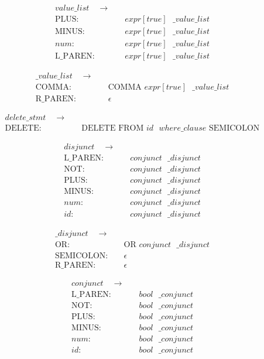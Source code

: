 \documentclass{article}
\begin{document}
\begin{align*}
value\_list \quad  \to & \quad\\
\text{PLUS}: & \quad expr[true] \text{ } \_value\_list \\
\text{MINUS}: & \quad expr[true] \text{ } \_value\_list \\
num: & \quad expr[true] \text{ } \_value\_list \\
\text{L\_PAREN}: & \quad expr[true] \text{ } \_value\_list
\end{align*}

\begin{align*}
\_value\_list \quad  \to & \quad\\
\text{COMMA}: & \quad \text{COMMA } expr[true] \text{ } \_value\_list \\
\text{R\_PAREN}: & \quad \epsilon
\end{align*}

\begin{align*}
delete\_stmt \quad  \to & \quad\\
\text{DELETE}: & \quad \text{DELETE FROM } id \text{ } where\_clause \text{ SEMICOLON}
\end{align*}


\begin{align*}
disjunct \quad  \to & \quad\\
\text{L\_PAREN}: & \quad conjunct \text{ } \_disjunct \\
\text{NOT}: & \quad conjunct \text{ } \_disjunct \\
\text{PLUS}: & \quad conjunct \text{ } \_disjunct \\
\text{MINUS}: & \quad conjunct \text{ } \_disjunct \\
num: & \quad conjunct \text{ } \_disjunct \\
id: & \quad conjunct \text{ } \_disjunct
\end{align*}

\begin{align*}
\_disjunct \quad  \to & \quad\\
\text{OR}: & \quad \text{OR } conjunct \text{ } \_disjunct\\
\text{SEMICOLON}: & \quad \epsilon \\
\text{R\_PAREN}: & \quad \epsilon
\end{align*}

\begin{align*}
conjunct \quad  \to & \quad\\
\text{L\_PAREN}: & \quad bool \text{ } \_conjunct \\
\text{NOT}: & \quad bool \text{ } \_conjunct \\
\text{PLUS}: & \quad bool \text{ } \_conjunct \\
\text{MINUS}: & \quad bool \text{ } \_conjunct \\
num: & \quad bool \text{ } \_conjunct \\
id: & \quad  bool \text{ } \_conjunct
\end{align*}
\end{document}
